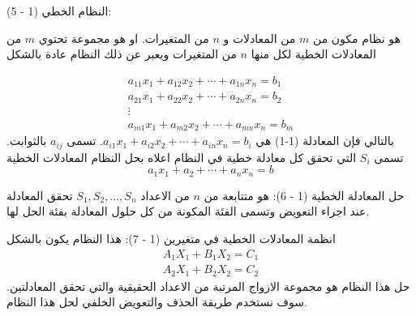 	\begin{frame}
		\begin{exampleblock}{النظام الخطي (1 - 5):}
			
			هو نظام مكون من $m$ من المعادلات و $n$ من المتغيرات. او هو مجموعة تحتوي $m$ من المعادلات الخطية لكل منها $n$ من المتغيرات ويعبر عن ذلك النظام عادة بالشكل

			\begin{equation}
				\begin{gathered}
					a_{11}x_1 + a_{12}x_2 + \cdots + a_{1n} x_n = b_1\\
					a_{21}x_1 + a_{22}x_2 + \cdots + a_{2n} x_n = b_2\\
					\vdots\\
					a_{m1}x_1 + a_{m2}x_2 + \cdots + a_{mn} x_n = b_m
				\end{gathered}
			\end{equation}
			بالتالي فإن المعادلة (1-1) هي $a_{i1}x_1+a_{i2}x_2 +\cdots+a_{in}x_n=b_i$. تسمى $a_{ij}$ بالثوابت. تسمى $S_i$ التي تحقق كل معادلة خطية في النظام اعلاه بحل النظام المعادلات الخطية
			\[
			a_1x_1 + a_2 + \cdots + a_n x_n = b
			\]
		\end{exampleblock}
	\end{frame}
	
	\begin{frame}
	    \begin{exampleblock}{حل المعادلة الخطية (1 - 6):}
	    	هو متتابعة من $n$ من الاعداد $S_1,S_2,\dots,S_n$ تحقق المعادلة عند اجراء التعويض وتسمى الفئة المكونة من كل  حلول المعادلة بفئة الحل لها.
	    \end{exampleblock}
	     \begin{exampleblock}{انظمة المعادلات الخطية في متغيرين (1 - 7):}
	    		    		    	هذا النظام يكون بالشكل
	    		    	\begin{gather*}
	    		    		A_1 X_1 + B_1X_2 = C_1\\
	    		    		A_2 X_1 + B_2 X_2 = C_2
	    		    	\end{gather*}
	    		    	حل هذا النظام هو مجموعة الازواج المرتبة من الاعداد الحقيقية والتي تحقق المعادلتين. سوف نستخدم طريقة الحذف والتعويض الخلفي لحل هذا النظام.
	   \end{exampleblock}
	\end{frame}
	
